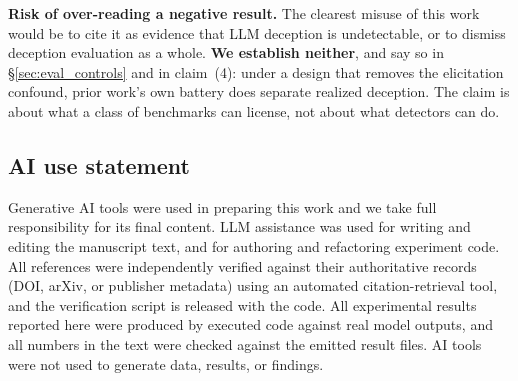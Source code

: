 \documentclass{article} %
\begin{document}
\textbf{Risk of over-reading a negative result.} The clearest misuse of this work
would be to cite it as evidence that LLM deception is undetectable, or to dismiss
deception evaluation as a whole. \textbf{We establish neither}, and say so in
§\ref{sec:eval_controls} and in claim~(4): under a design that removes the
elicitation confound, prior work's own battery does separate realized deception.
The claim is about what a class of benchmarks can license, not about what
detectors can do.

\subsection*{AI use statement}
Generative AI tools were used in preparing this work and we take full
responsibility for its final content. LLM assistance was used for writing and
editing the manuscript text, and for authoring and refactoring experiment code.
All references were independently verified against their authoritative records
(DOI, arXiv, or publisher metadata) using an automated citation-retrieval tool,
and the verification script is released with the code. All experimental results
reported here were produced by executed code against real model outputs, and
all numbers in the text were checked against the emitted result files. AI tools
were not used to generate data, results, or findings.
\end{document}
